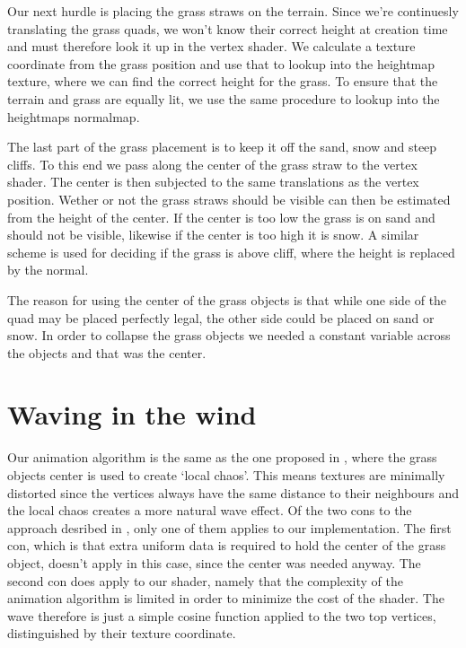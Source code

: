 
Our next hurdle is placing the grass straws on the terrain. Since
we're continuesly translating the grass quads, we won't know their
correct height at creation time and must therefore look it up in the
vertex shader. We calculate a texture coordinate from the grass
position and use that to lookup into the heightmap texture, where we
can find the correct height for the grass. To ensure that the terrain
and grass are equally lit, we use the same procedure to
lookup into the heightmaps normalmap.


The last part of the grass placement is to keep it off the sand, snow
and steep cliffs. To this end we pass along the center of the grass
straw to the vertex shader. The center is then subjected to the same
translations as the vertex position. Wether or not the grass straws
should be visible can then be estimated from the height of the
center. If the center is too low the grass is on sand and should not
be visible, likewise if the center is too high it is snow. A similar
scheme is used for deciding if the grass is above cliff, where the
height is replaced by the normal.

The reason for using the center of the grass objects is that while one
side of the quad may be placed perfectly legal, the other side could
be placed on sand or snow. In order to collapse the grass objects we
needed a constant variable across the objects and that was the center.


\section{Waving in the wind}

Our animation algorithm is the same as the one proposed in
, where the grass objects center is
used to create `local chaos'. This means textures are minimally
distorted since the vertices always have the same distance to their
neighbours and the local chaos creates a more natural wave effect. Of
the two cons to the approach desribed in
, only one of them applies to our
implementation. The first con, which is that extra uniform data is
required to hold the center of the grass object, doesn't apply in this
case, since the center was needed anyway. The second con does apply to
our shader, namely that the complexity of the animation algorithm is
limited in order to minimize the cost of the shader. The wave
therefore is just a simple cosine function applied to the two top
vertices, distinguished by their texture coordinate.



